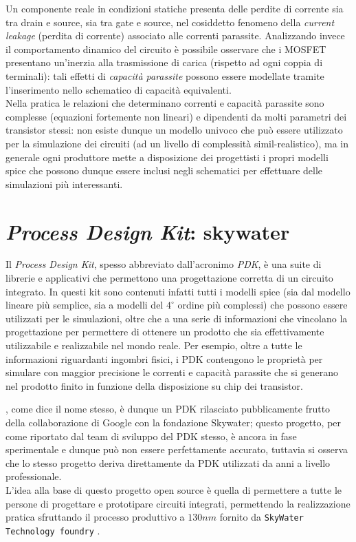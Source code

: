 	Un componente reale in condizioni statiche presenta delle perdite di corrente sia tra drain e source, sia tra gate e source, nel cosiddetto fenomeno della \textit{current leakage} (perdita di corrente) associato alle correnti parassite. Analizzando invece il comportamento dinamico del circuito è possibile osservare che i MOSFET presentano un'inerzia alla trasmissione di carica (rispetto ad ogni coppia di terminali): tali effetti di \textit{capacità parassite} possono essere modellate tramite l'inserimento nello schematico di capacità equivalenti. \\
	Nella pratica le relazioni che determinano correnti e capacità parassite sono complesse (equazioni fortemente non lineari) e dipendenti da molti parametri dei transistor stessi: non esiste dunque un modello univoco che può essere utilizzato per la simulazione dei circuiti (ad un livello di complessità simil-realistico), ma in generale ogni produttore mette a disposizione dei progettisti i propri modelli spice che possono dunque essere inclusi negli schematici per effettuare delle simulazioni più interessanti.
	
\section{\textit{Process Design Kit}: skywater}
	
	Il \textit{Process Design Kit}, spesso abbreviato dall'acronimo \textit{PDK}, è una suite di librerie e applicativi che permettono una progettazione corretta di un circuito integrato. In questi kit sono contenuti infatti tutti i modelli spice (sia dal modello lineare più semplice, sia a modelli del $4^\circ$ ordine più complessi) che possono essere utilizzati per le simulazioni, oltre che a una serie di informazioni che vincolano la progettazione per permettere di ottenere un prodotto che sia effettivamente utilizzabile e realizzabile nel mondo reale. Per esempio, oltre a tutte le informazioni riguardanti ingombri fisici, i PDK contengono le proprietà per simulare con maggior precisione le correnti e capacità parassite che si generano nel prodotto finito in funzione della disposizione su chip dei transistor.
	
	\skywater, come dice il nome stesso, è dunque un PDK rilasciato pubblicamente frutto della collaborazione di Google con la fondazione Skywater; questo progetto, per come riportato dal team di sviluppo del PDK stesso, è ancora in fase sperimentale e dunque può non essere perfettamente accurato, tuttavia si osserva che lo stesso progetto deriva direttamente da PDK utilizzati da anni a livello professionale. \\
	L'idea alla base di questo progetto open source è quella di permettere a tutte le persone di progettare e prototipare circuiti integrati, permettendo la realizzazione pratica sfruttando il processo produttivo a $130 nm$ fornito da \texttt{SkyWater Technology foundry} \cite{fossi}.
	
